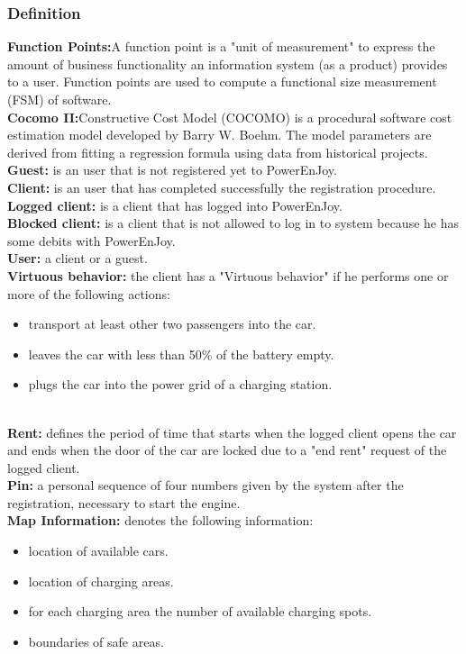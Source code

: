 \subsubsection{Definition}
\textbf{Function Points:}A function point is a "unit of measurement" to express the amount of business functionality an information system (as a product) provides to a user. Function points are used to compute a functional size measurement (FSM) of software. \\
\textbf{Cocomo II:}Constructive Cost Model (COCOMO) is a procedural software cost estimation model developed by Barry W. Boehm. The model parameters are derived from fitting a regression formula using data from historical projects.\\
\textbf{Guest:}
 is an user that is not registered yet to PowerEnJoy.\\
\textbf{Client:}
is an user that has completed successfully the registration procedure.\\
\textbf{Logged client:}
is a client that has logged into PowerEnJoy.\\
\textbf{Blocked client:}
is a client that is not allowed to log in to system because he has some debits with PowerEnJoy.\\
\textbf{User:}
a client or a guest.\\
\textbf{Virtuous  behavior:}
the client has a "Virtuous behavior" if he performs one or more of the following actions: 
\begin{itemize}
\item transport at least other two passengers into the car.
\item leaves the car with less than 50\% of the battery empty.
\item plugs the car into the power grid of a charging station.
\end{itemize}
\emph{\\}
\textbf{Rent:} defines the period of time that starts when the logged client opens the car and ends when the door of the car are locked due to a "end rent" request of the logged client.\\
\textbf{Pin:} a personal sequence of four numbers given by the system after the registration, necessary to start the engine.\\
\textbf{Map Information:}
denotes the following information: 
\begin{itemize}
\item location of available cars.
\item location of charging areas.
\item for each charging area the number of available charging spots.
\item boundaries of safe areas.
\end{itemize}
